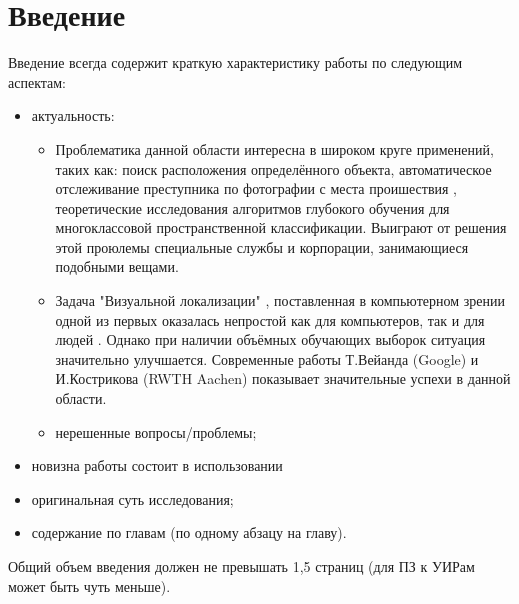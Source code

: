 \chapter*{Введение}
\label{sec:afterwords}

Введение всегда содержит краткую характеристику работы по следующим аспектам:

\begin{itemize}
	\item актуальность:
	\begin{itemize}
		\item Проблематика данной области интересна в широком круге применений, таких как: 
		поиск расположения определённого объекта, автоматическое отслеживание преступника по фотографии с места проишествия , теоретические исследования алгоритмов глубокого обучения для многоклассовой пространственной классификации. Выиграют от решения этой проюлемы специальные службы и корпорации, занимающиеся подобными вещами.
		\item Задача "Визуальной локализации" \cite{im2gps}, поставленная в компьютерном зрении одной из первых оказалась непростой как для компьютеров, так и для людей \cite{Thompson1999geomReas}. Однако при наличии объёмных обучающих выборок ситуация значительно улучшается. Современные работы Т.Вейанда (Google) и И.Кострикова (RWTH Aachen) \cite{weyand2016planet} показывает значительные успехи в данной области.
		\item нерешенные вопросы/проблемы;
	\end{itemize}
	\item новизна работы состоит в использовании 
	\item оригинальная суть исследования;
	\item содержание по главам (по одному абзацу на главу).
\end{itemize}

Общий объем введения должен не превышать 1,5 страниц (для ПЗ к УИРам может быть чуть меньше).


